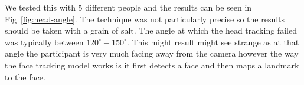 We tested this with 5 different people and the results can be seen in Fig~\ref{fig:head-angle}. The technique was not particularly precise so the results should be taken with a grain of salt. The angle at which the head tracking failed was typically between $120^{\circ} - 150^{\circ}$. This might result might see strange as at that angle the participant is very much facing away from the camera however the way the face tracking model works is it first detects a face and then maps a landmark to the face. \\ 

\begin{invisBox}  
	\hfill
\end{invisBox}

